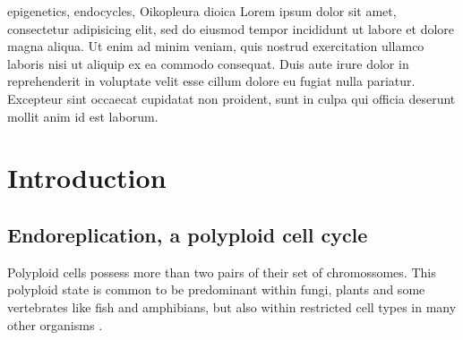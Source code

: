 \documentclass[11pt,twoside,a4paper]{report}
\begin{document}
\cleardoublepage


\TitlePage
    \vspace*{55mm}
        {epigenetics, endocycles, Oikopleura dioica}
		{Lorem ipsum dolor sit amet, consectetur adipisicing elit, sed do eiusmod tempor incididunt ut labore et dolore magna aliqua. Ut enim ad minim veniam, quis nostrud exercitation ullamco laboris nisi ut aliquip ex ea commodo consequat. Duis aute irure dolor in reprehenderit in voluptate velit esse cillum dolore eu fugiat nulla pariatur. Excepteur sint occaecat cupidatat non proident, sunt in culpa qui officia deserunt mollit anim id est laborum.}
\EndTitlePage

\cleardoublepage



\tableofcontents

\listoffigures

\listoftables

\cleardoublepage
\chapter{Introduction}

	\section{Endoreplication, a polyploid cell cycle}
		Polyploid cells possess more than two pairs of their set of chromossomes. This polyploid state is common to be predominant within fungi, plants and some vertebrates like fish and amphibians, but also within restricted cell types in many other organisms \cite{Fox2013}.
		
\end{document}
